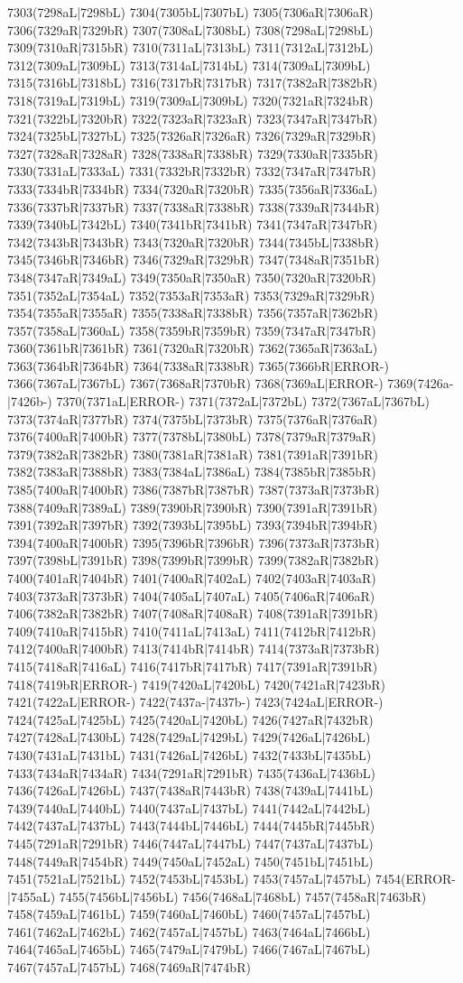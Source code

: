 7303(7298aL|7298bL) 7304(7305bL|7307bL) 7305(7306aR|7306aR) 7306(7329aR|7329bR) 7307(7308aL|7308bL) 7308(7298aL|7298bL) 7309(7310aR|7315bR) 7310(7311aL|7313bL) 7311(7312aL|7312bL) 7312(7309aL|7309bL) 7313(7314aL|7314bL) 7314(7309aL|7309bL) 7315(7316bL|7318bL) 7316(7317bR|7317bR) 7317(7382aR|7382bR) 7318(7319aL|7319bL) 7319(7309aL|7309bL) 7320(7321aR|7324bR) 7321(7322bL|7320bR) 7322(7323aR|7323aR) 7323(7347aR|7347bR) 7324(7325bL|7327bL) 7325(7326aR|7326aR) 7326(7329aR|7329bR) 7327(7328aR|7328aR) 7328(7338aR|7338bR) 7329(7330aR|7335bR) 7330(7331aL|7333aL) 7331(7332bR|7332bR) 7332(7347aR|7347bR) 7333(7334bR|7334bR) 7334(7320aR|7320bR) 7335(7356aR|7336aL) 7336(7337bR|7337bR) 7337(7338aR|7338bR) 7338(7339aR|7344bR) 7339(7340bL|7342bL) 7340(7341bR|7341bR) 7341(7347aR|7347bR) 7342(7343bR|7343bR) 7343(7320aR|7320bR) 7344(7345bL|7338bR) 7345(7346bR|7346bR) 7346(7329aR|7329bR) 7347(7348aR|7351bR) 7348(7347aR|7349aL) 7349(7350aR|7350aR) 7350(7320aR|7320bR) 7351(7352aL|7354aL) 7352(7353aR|7353aR) 7353(7329aR|7329bR) 7354(7355aR|7355aR) 7355(7338aR|7338bR) 7356(7357aR|7362bR) 7357(7358aL|7360aL) 7358(7359bR|7359bR) 7359(7347aR|7347bR) 7360(7361bR|7361bR) 7361(7320aR|7320bR) 7362(7365aR|7363aL) 7363(7364bR|7364bR) 7364(7338aR|7338bR) 7365(7366bR|ERROR-) 7366(7367aL|7367bL) 7367(7368aR|7370bR) 7368(7369aL|ERROR-) 7369(7426a-|7426b-) 7370(7371aL|ERROR-) 7371(7372aL|7372bL) 7372(7367aL|7367bL) 7373(7374aR|7377bR) 7374(7375bL|7373bR) 7375(7376aR|7376aR) 7376(7400aR|7400bR) 7377(7378bL|7380bL) 7378(7379aR|7379aR) 7379(7382aR|7382bR) 7380(7381aR|7381aR) 7381(7391aR|7391bR) 7382(7383aR|7388bR) 7383(7384aL|7386aL) 7384(7385bR|7385bR) 7385(7400aR|7400bR) 7386(7387bR|7387bR) 7387(7373aR|7373bR) 7388(7409aR|7389aL) 7389(7390bR|7390bR) 7390(7391aR|7391bR) 7391(7392aR|7397bR) 7392(7393bL|7395bL) 7393(7394bR|7394bR) 7394(7400aR|7400bR) 7395(7396bR|7396bR) 7396(7373aR|7373bR) 7397(7398bL|7391bR) 7398(7399bR|7399bR) 7399(7382aR|7382bR) 7400(7401aR|7404bR) 7401(7400aR|7402aL) 7402(7403aR|7403aR) 7403(7373aR|7373bR) 7404(7405aL|7407aL) 7405(7406aR|7406aR) 7406(7382aR|7382bR) 7407(7408aR|7408aR) 7408(7391aR|7391bR) 7409(7410aR|7415bR) 7410(7411aL|7413aL) 7411(7412bR|7412bR) 7412(7400aR|7400bR) 7413(7414bR|7414bR) 7414(7373aR|7373bR) 7415(7418aR|7416aL) 7416(7417bR|7417bR) 7417(7391aR|7391bR) 7418(7419bR|ERROR-) 7419(7420aL|7420bL) 7420(7421aR|7423bR) 7421(7422aL|ERROR-) 7422(7437a-|7437b-) 7423(7424aL|ERROR-) 7424(7425aL|7425bL) 7425(7420aL|7420bL) 7426(7427aR|7432bR) 7427(7428aL|7430bL) 7428(7429aL|7429bL) 7429(7426aL|7426bL) 7430(7431aL|7431bL) 7431(7426aL|7426bL) 7432(7433bL|7435bL) 7433(7434aR|7434aR) 7434(7291aR|7291bR) 7435(7436aL|7436bL) 7436(7426aL|7426bL) 7437(7438aR|7443bR) 7438(7439aL|7441bL) 7439(7440aL|7440bL) 7440(7437aL|7437bL) 7441(7442aL|7442bL) 7442(7437aL|7437bL) 7443(7444bL|7446bL) 7444(7445bR|7445bR) 7445(7291aR|7291bR) 7446(7447aL|7447bL) 7447(7437aL|7437bL) 7448(7449aR|7454bR) 7449(7450aL|7452aL) 7450(7451bL|7451bL) 7451(7521aL|7521bL) 7452(7453bL|7453bL) 7453(7457aL|7457bL) 7454(ERROR-|7455aL) 7455(7456bL|7456bL) 7456(7468aL|7468bL) 7457(7458aR|7463bR) 7458(7459aL|7461bL) 7459(7460aL|7460bL) 7460(7457aL|7457bL) 7461(7462aL|7462bL) 7462(7457aL|7457bL) 7463(7464aL|7466bL) 7464(7465aL|7465bL) 7465(7479aL|7479bL) 7466(7467aL|7467bL) 7467(7457aL|7457bL) 7468(7469aR|7474bR) 
